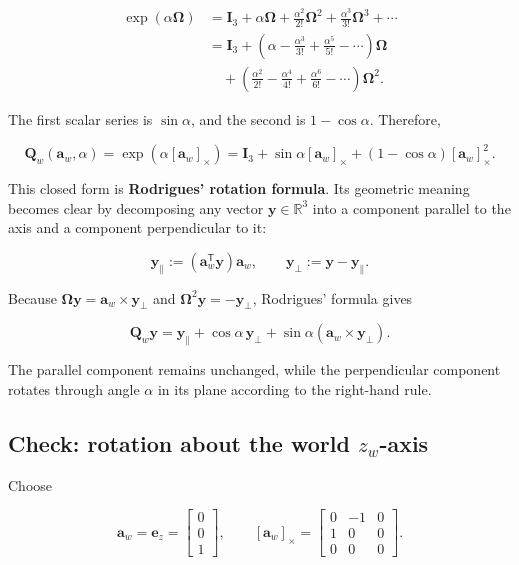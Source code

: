 \documentclass[
  australian,
  12pt,
  letterpaper,
  DIV=11,
  numbers=noendperiod,
  twoside]{scrreprt}
\begin{document}
\[
\begin{aligned}
\exp(\alpha\boldsymbol\Omega)
&=
\mathbf I_3
+
\alpha\boldsymbol\Omega
+
\frac{\alpha^2}{2!}\boldsymbol\Omega^2
+
\frac{\alpha^3}{3!}\boldsymbol\Omega^3
+
\cdots\\
&=
\mathbf I_3
+
\left(
\alpha-
\frac{\alpha^3}{3!}
+
\frac{\alpha^5}{5!}
-
\cdots
\right)\boldsymbol\Omega\\
&\quad+
\left(
\frac{\alpha^2}{2!}
-
\frac{\alpha^4}{4!}
+
\frac{\alpha^6}{6!}
-
\cdots
\right)\boldsymbol\Omega^2.
\end{aligned}
\]

The first scalar series is \(\sin\alpha\), and the second is
\(1-\cos\alpha\). Therefore,

\[
\boxed{
\mathbf Q_w(\mathbf a_w,\alpha)
=
\exp\!\left(\alpha[\mathbf a_w]_\times\right)
=
\mathbf I_3
+
\sin\alpha[\mathbf a_w]_\times
+
(1-\cos\alpha)[\mathbf a_w]_\times^2
}.
\]

This closed form is \textbf{Rodrigues' rotation formula}. Its geometric
meaning becomes clear by decomposing any vector
\(\mathbf y\in\mathbb R^3\) into a component parallel to the axis and a
component perpendicular to it:

\[
\mathbf y_{\parallel}
\mathrel{:=}
(\mathbf a_w^\mathsf T\mathbf y)\mathbf a_w,
\qquad
\mathbf y_{\perp}
\mathrel{:=}
\mathbf y-
\mathbf y_{\parallel}.
\]

Because
\(\boldsymbol\Omega\mathbf y=\mathbf a_w\times\mathbf y_{\perp}\) and
\(\boldsymbol\Omega^2\mathbf y=-\mathbf y_{\perp}\), Rodrigues' formula
gives

\[
\boxed{
\mathbf Q_w\mathbf y
=
\mathbf y_{\parallel}
+
\cos\alpha\,\mathbf y_{\perp}
+
\sin\alpha
(\mathbf a_w\times\mathbf y_{\perp})
}.
\]

The parallel component remains unchanged, while the perpendicular
component rotates through angle \(\alpha\) in its plane according to the
right-hand rule.

\subsection{\texorpdfstring{Check: rotation about the world
\(z_w\)-axis}{Check: rotation about the world z\_w-axis}}\label{check-rotation-about-the-world-z_w-axis}

Choose

\[
\mathbf a_w
=
\mathbf e_z
=
\begin{bmatrix}0\\0\\1\end{bmatrix},
\qquad
[\mathbf a_w]_\times
=
\begin{bmatrix}
0&-1&0\\
1&0&0\\
0&0&0
\end{bmatrix}.
\]
\end{document}
